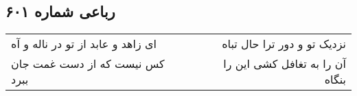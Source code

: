 \begin{center}
\section*{رباعی شماره ۶۰۱}
\label{sec:sh601}
\begin{longtable}{l p{0.5cm} r}
ای زاهد و عابد از تو در ناله و آه
&&
نزدیک تو و دور ترا حال تباه
\\
کس نیست که از دست غمت جان ببرد
&&
آن را به تغافل کشی این را بنگاه
\\
\end{longtable}
\end{center}
